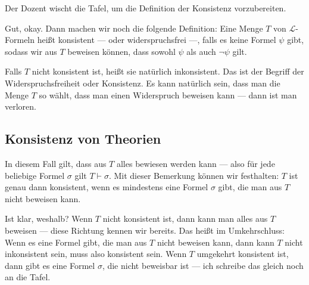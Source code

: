 \begin{lecture-break}[Tafelreinigung]
Der Dozent wischt die Tafel, um die Definition der Konsistenz vorzubereiten.
\end{lecture-break}

\begin{spoken-clean}[00:24:41 - 00:26:35]
Gut, okay. Dann machen wir noch die folgende Definition: Eine Menge $T$ von $\mathcal{L}$-Formeln heißt konsistent --- oder widerspruchsfrei ---, falls es keine Formel $\psi$ gibt, sodass wir aus $T$ beweisen können, dass sowohl $\psi$ als auch $\neg\psi$ gilt.

Falls $T$ nicht konsistent ist, heißt sie natürlich inkonsistent. Das ist der Begriff der Widerspruchsfreiheit oder Konsistenz. Es kann natürlich sein, dass man die Menge $T$ so wählt, dass man einen Widerspruch beweisen kann --- dann ist man verloren.
\end{spoken-clean}

\begin{math-stroke}
\end{math-stroke}

\subsection{Konsistenz von Theorien}
\begin{spoken-clean}[00:26:35 - 00:28:32]
In diesem Fall gilt, dass aus $T$ alles bewiesen werden kann --- also für jede beliebige Formel $\sigma$ gilt $T \vdash \sigma$. Mit dieser Bemerkung können wir festhalten: $T$ ist genau dann konsistent, wenn es mindestens eine Formel $\sigma$ gibt, die man aus $T$ nicht beweisen kann.

Ist klar, weshalb? Wenn $T$ nicht konsistent ist, dann kann man alles aus $T$ beweisen --- diese Richtung kennen wir bereits. Das heißt im Umkehrschluss: Wenn es eine Formel gibt, die man aus $T$ nicht beweisen kann, dann kann $T$ nicht inkonsistent sein, muss also konsistent sein. Wenn $T$ umgekehrt konsistent ist, dann gibt es eine Formel $\sigma$, die nicht beweisbar ist --- ich schreibe das gleich noch an die Tafel.
\end{spoken-clean}

